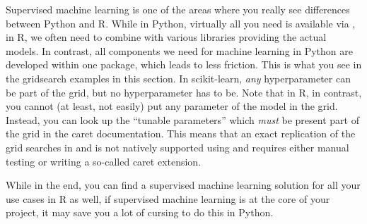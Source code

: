 \begin{feature}
    Supervised machine learning is one of the areas where you really
    see differences between Python and R. While in Python, virtually
    all you need is available via , in R, we often
    need to combine  with various libraries providing the
    actual models. In contrast, all components we need for machine
    learning in Python are developed within one package, which leads
    to less friction. This is what you see in the gridsearch examples
    in this section. In scikit-learn, \emph{any} hyperparameter can be
    part of the grid, but no hyperparameter has to be.  Note that in
    R, in contrast, you cannot (at least, not easily) put any
    parameter of the model in the grid. Instead, you can look up the
    ``tunable parameters'' which \emph{must} be present part of the
    grid in the caret documentation. This means that an exact
    replication of the grid searches in  and
     is not natively supported using 
    and requires either manual testing or writing a so-called caret
    extension.

    While in the end, you can find a supervised machine learning
    solution for all your use cases in R as well, if supervised
    machine learning is at the core of your project, it may save you a
    lot of cursing to do this in Python.
\end{feature}

